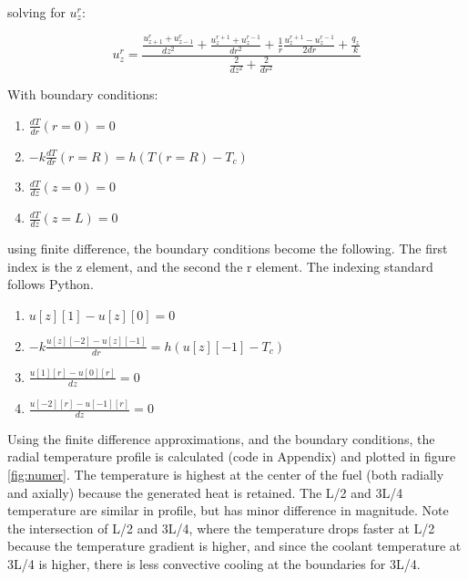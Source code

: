 \documentclass[12pt,letterpaper]{article}
\begin{document}
solving for $u_z^r$:

\[ u_z^r = \frac{\frac{u_{z+1}^r + u_{z-1}^r}{dz^2} + \frac{u^{r+1}_z + u^{r-1}_z}{dr^2}
  + \frac{1}{r} \frac{u^{r+1}_z - u^{r-1}_z}{2dr} + \frac{q_z}{k}}{\frac{2}{dz^2} + \frac{2}{dr^2}} \]

With boundary conditions:

\begin{enumerate}
    \item $\frac{dT}{dr}(r=0) = 0$
    \item $-k \frac{dT}{dr} (r=R) = h(T(r=R) - T_c)$
    \item $\frac{dT}{dz}(z=0) = 0 $
    \item $\frac{dT}{dz}(z=L) = 0 $
\end{enumerate}

using finite difference, the boundary conditions become the following.
The first index is the z element, and the second the r element. The indexing
standard follows Python.
\begin{enumerate}
    \item $u[z][1]-u[z][0] = 0$
    \item $-k \frac{u[z][-2]-u[z][-1]}{dr} = h(u[z][-1] - T_c)$
    \item $ \frac{u[1][r] - u[0][r]}{dz} = 0$
    \item $\frac{u[-2][r] - u[-1][r]}{dz} = 0 $
\end{enumerate}

Using the finite difference approximations, and the boundary conditions,
the radial temperature profile is calculated (code in Appendix) and plotted in figure \ref{fig:numer}.
The temperature is highest at the center of the fuel (both radially
and axially) because the generated heat is retained. The L/2 and 3L/4 temperature are
similar in profile, but has minor difference in magnitude. Note the intersection of
L/2 and 3L/4, where the temperature drops faster at L/2 because the temperature gradient
is higher, and since the coolant temperature at 3L/4 is higher, there is less convective
cooling at the boundaries for 3L/4. 
\end{document}
